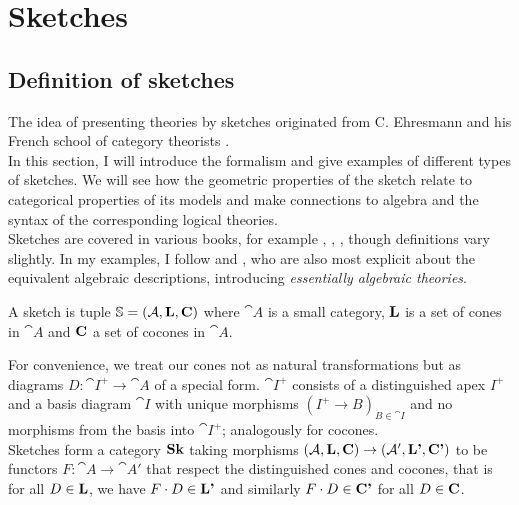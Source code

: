 \section{Sketches}
\label{sec:sketches}

\subsection{Definition of sketches}

The idea of presenting theories by sketches originated from C. Ehresmann and his French school of category theorists \cite{Ehresmann}. \\

In this section, I will introduce the formalism and give examples of different types of sketches. We will see how the geometric properties of the sketch relate to categorical properties of its models and make connections to algebra and the syntax of the corresponding logical theories. \\

Sketches are covered in various books, for example \cite{MakkaiPare}, \cite{CTCS}, \cite{TTT}, though definitions vary slightly. In my examples, I follow \cite[Chapter D2.1.]{elephant} and \cite[Chapter 1.C]{AdamekRosicky}, who are also most explicit about the equivalent algebraic descriptions, introducing \emph{essentially algebraic theories}.

\begin{Definition}[Sketch]
A sketch is tuple $\mathbb S = (\mathcal{A}, \textbf{L}, \textbf{C})$ where $\cat A$ is a small category, $\textbf{L}$ is a set of cones in $\cat A$ and $\textbf{C}$ a set of cocones in $\cat A$.
\end{Definition}

For convenience, we treat our cones not as natural transformations but as diagrams $D : \cat I^+ \to \cat A$ of a special form. $\cat I^+$ consists of a distinguished apex $I^+$ and a basis diagram $\cat I$ with unique morphisms $(I^+ \to B)_{B \in \cat I}$ and no morphisms from the basis into $\cat I^+$; analogously for cocones. \\

Sketches form a category $\mathbf{Sk}$ taking morphisms $(\mathcal{A}, \textbf{L}, \textbf{C}) \to (\mathcal{A}', \textbf{L'}, \textbf{C'})$ to be functors $F : \cat A \to \cat A'$ that respect the distinguished cones and cocones, that is for all $D \in \textbf{L}$, we have $F \cdot D \in \textbf{L'}$ and similarly $F \cdot D \in \textbf{C'}$ for all $D \in \textbf{C}$. \\

